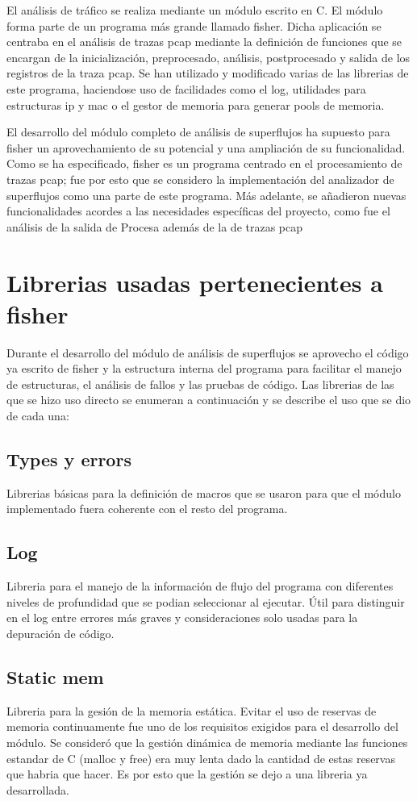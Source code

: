 \documentclass[twoside, 12pt]{epstfg}
\begin{document}
El análisis de tráfico se realiza mediante un módulo escrito en C. El módulo forma parte de un programa más grande llamado fisher. Dicha aplicación se centraba en el análisis de trazas pcap mediante la definición de funciones que se encargan de la inicialización, preprocesado, análisis, postprocesado y salida de los registros de la traza pcap. Se han utilizado y modificado varias de las librerias de este programa, haciendose uso de facilidades como el log, utilidades para estructuras ip y mac o el gestor de memoria para generar pools de memoria.

El desarrollo del módulo completo de análisis de superflujos ha supuesto para fisher un aprovechamiento de su potencial y una ampliación de su funcionalidad. Como se ha especificado, fisher es un programa centrado en el procesamiento de trazas pcap; fue por esto que se considero la implementación del analizador de superflujos como una parte de este programa. Más adelante, se añadieron nuevas funcionalidades acordes a las necesidades específicas del proyecto, como fue el análisis de la salida de Procesa además de la de trazas pcap


\section{Librerias usadas pertenecientes a fisher}
Durante el desarrollo del módulo de análisis de superflujos se aprovecho el código ya escrito de fisher y la estructura interna del programa para facilitar el manejo de estructuras, el análisis de fallos y las pruebas de código. Las librerias de las que se hizo uso directo se enumeran a continuación y se describe el uso que se dio de cada una:
\subsection{Types y errors}
Librerias básicas para la definición de macros que se usaron para que el módulo implementado fuera coherente con el resto del programa.
\subsection{Log} 
Libreria para el manejo de la información de flujo del programa con diferentes niveles de profundidad que se podian seleccionar al ejecutar. Útil para distinguir en el log entre errores más graves y consideraciones solo usadas para la depuración de código.
\subsection{Static mem}
Libreria para la gesión de la memoria estática. Evitar el uso de reservas de memoria continuamente fue uno de los requisitos exigidos para el desarrollo del módulo. Se consideró que la gestión dinámica de memoria mediante las funciones estandar de C (malloc y free) era muy lenta dado la cantidad de estas reservas que habria que hacer. Es por esto que la gestión se dejo a una libreria ya desarrollada. 
\end{document}
